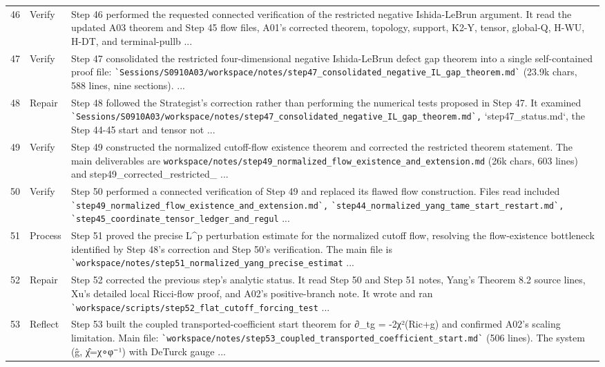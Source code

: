 \documentclass[UTF8,fontset=fandol,zihao=-4]{ctexart}
\begin{document}
\begin{longtable}{r p{} >{\raggedright\arraybackslash}p{}}
46 & Verify & Step 46 performed the requested connected verification of the restricted negative Ishida-LeBrun argument. It read the updated A03 theorem and Step 45 flow files, A01's corrected theorem, topology, support, K2-Y, tensor, global-Q, H-WU, H-DT, and terminal-pullb ...\\
47 & Verify & Step 47 consolidated the restricted four-dimensional negative Ishida-LeBrun defect gap theorem into a single self-contained proof file: \nolinkurl{`Sessions/S0910A03/workspace/notes/step47_consolidated_negative_IL_gap_theorem.md`} (23.9k chars, 588 lines, nine sections).  ...\\
48 & Repair & Step 48 followed the Strategist's correction rather than performing the numerical tests proposed in Step 47. It examined \nolinkurl{`Sessions/S0910A03/workspace/notes/step47_consolidated_negative_IL_gap_theorem.md`,} `step47\_status.md`, the Step 44-45 start and tensor not ...\\
49 & Verify & Step 49 constructed the normalized cutoff-flow existence theorem and corrected the restricted theorem statement. The main deliverables are \nolinkurl{workspace/notes/step49_normalized_flow_existence_and_extension.md} (26k chars, 603 lines) and step49\_corrected\_restricted\_ ...\\
50 & Verify & Step 50 performed a connected verification of Step 49 and replaced its flawed flow construction. Files read included \nolinkurl{`step49_normalized_flow_existence_and_extension.md`,} \nolinkurl{`step44_normalized_yang_tame_start_restart.md`,} \nolinkurl{`step45_coordinate_tensor_ledger_and_regul} ...\\
51 & Process & Step 51 proved the precise L\textasciicircum{}p perturbation estimate for the normalized cutoff flow, resolving the flow-existence bottleneck identified by Step 48's correction and Step 50's verification. The main file is \nolinkurl{`workspace/notes/step51_normalized_yang_precise_estimat} ...\\
52 & Repair & Step 52 corrected the previous step's analytic status. It read Step 50 and Step 51 notes, Yang's Theorem 8.2 source lines, Xu's detailed local Ricci-flow proof, and A02's positive-branch note. It wrote and ran \nolinkurl{`workspace/scripts/step52_flat_cutoff_forcing_test} ...\\
53 & Reflect & Step 53 built the coupled transported-coefficient start theorem for ∂\_tg = -2χ²(Ric+g) and confirmed A02's scaling limitation. Main file: \nolinkurl{`workspace/notes/step53_coupled_transported_coefficient_start.md`} (506 lines). The system (ĝ, χ̂=χ∘φ⁻¹) with DeTurck gauge ...\\

\end{longtable}
\end{document}

